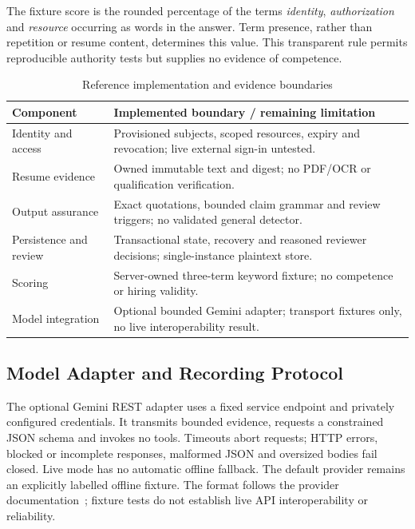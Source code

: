 \documentclass[conference]{IEEEtran}
\begin{document}
The fixture score is the rounded percentage of the terms \emph{identity}, \emph{authorization} and \emph{resource} occurring as words in the answer. Term presence, rather than repetition or resume content, determines this value. This transparent rule permits reproducible authority tests but supplies no evidence of competence.

\begin{table}[t]
\caption{Reference implementation and evidence boundaries}
\label{tab:boundaries}
\centering
\begin{tabular}{@{}L{0.29\columnwidth}L{0.64\columnwidth}@{}}
\toprule
Component & Implemented boundary / remaining limitation \\
\midrule
Identity and access & Provisioned subjects, scoped resources, expiry and revocation; live external sign-in untested. \\
Resume evidence & Owned immutable text and digest; no PDF/OCR or qualification verification. \\
Output assurance & Exact quotations, bounded claim grammar and review triggers; no validated general detector. \\
Persistence and review & Transactional state, recovery and reasoned reviewer decisions; single-instance plaintext store. \\
Scoring & Server-owned three-term keyword fixture; no competence or hiring validity. \\
Model integration & Optional bounded Gemini adapter; transport fixtures only, no live interoperability result. \\
\bottomrule
\end{tabular}
\end{table}

\subsection{Model Adapter and Recording Protocol}
The optional Gemini REST adapter uses a fixed service endpoint and privately configured credentials. It transmits bounded evidence, requests a constrained JSON schema and invokes no tools. Timeouts abort requests; HTTP errors, blocked or incomplete responses, malformed JSON and oversized bodies fail closed. Live mode has no automatic offline fallback. The default provider remains an explicitly labelled offline fixture. The format follows the provider documentation~\cite{google_gemini}; fixture tests do not establish live API interoperability or reliability.
\end{document}
